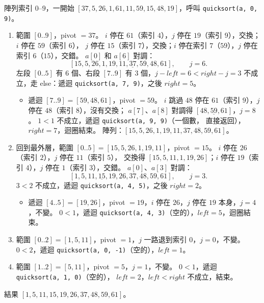 \begin{pastsoln}
陣列索引 $0$--$9$，一開始 $[37, 5, 26, 1, 61, 11, 59, 15, 48, 19]$，呼叫 \texttt{quicksort(a, 0, 9)}。
\begin{enumerate}[label=\arabic*.]
\item 範圍 $[0..9]$，pivot $= 37$。 $i$ 停在 $61$（索引 $4$），$j$ 停在 $19$（索引 $9$），交換；$i$ 停在 $59$（索引 $6$），
$j$ 停在 $15$（索引 $7$），交換；$i$ 停在索引 $7$（$59$），$j$ 停在索引 $6$（$15$），交錯。 $a[0]$ 和 $a[6]$ 對調：
\[
[15, 5, 26, 1, 19, 11, \underline{37}, 59, 48, 61], \qquad j = 6.
\]
左段 $[0..5]$ 有 $6$ 個、右段 $[7..9]$ 有 $3$ 個，$j - \mathit{left} = 6 < \mathit{right} - j = 3$ 不成立，走 else：遞迴
\texttt{quicksort(a, 7, 9)}，之後 $\mathit{right} = 5$。
  \begin{itemize}
  \item 遞迴 $[7..9] = [59, 48, 61]$，pivot $= 59$。 $i$ 跳過 $48$ 停在 $61$（索引 $9$），$j$ 停在 $48$（索引 $8$），沒有交換；
  $a[7]$、$a[8]$ 對調得 $[48, \underline{59}, 61]$，$j = 8$。 $1 < 1$ 不成立，遞迴 \texttt{quicksort(a, 9, 9)}（一個數，
  直接返回），$\mathit{right} = 7$，迴圈結束。 陣列：$[15, 5, 26, 1, 19, 11, 37, 48, 59, 61]$。
  \end{itemize}
\item 回到最外層，範圍 $[0..5] = [15, 5, 26, 1, 19, 11]$，pivot $= 15$。 $i$ 停在 $26$（索引 $2$），$j$ 停在 $11$（索引 $5$），
交換得 $[15, 5, 11, 1, 19, 26]$；$i$ 停在 $19$（索引 $4$），$j$ 停在 $1$（索引 $3$），交錯。 $a[0]$、$a[3]$ 對調：
\[
[1, 5, 11, \underline{15}, 19, 26, 37, 48, 59, 61], \qquad j = 3.
\]
$3 < 2$ 不成立，遞迴 \texttt{quicksort(a, 4, 5)}，之後 $\mathit{right} = 2$。
  \begin{itemize}
  \item 遞迴 $[4..5] = [19, 26]$，pivot $= 19$，$i$ 停在 $26$，$j$ 停在 $19$ 本身，$j = 4$，不變。 $0 < 1$，遞迴
  \texttt{quicksort(a, 4, 3)}（空的），$\mathit{left} = 5$，迴圈結束。
  \end{itemize}
\item 範圍 $[0..2] = [1, 5, 11]$，pivot $= 1$，$j$ 一路退到索引 $0$，$j = 0$，不變。 $0 < 2$，遞迴
\texttt{quicksort(a, 0, -1)}（空的），$\mathit{left} = 1$。
\item 範圍 $[1..2] = [5, 11]$，pivot $= 5$，$j = 1$，不變。 $0 < 1$，遞迴 \texttt{quicksort(a, 1, 0)}（空的），
$\mathit{left} = 2$，$\mathit{left} < \mathit{right}$ 不成立，結束。
\end{enumerate}
結果 $[1, 5, 11, 15, 19, 26, 37, 48, 59, 61]$。


\end{pastsoln}
